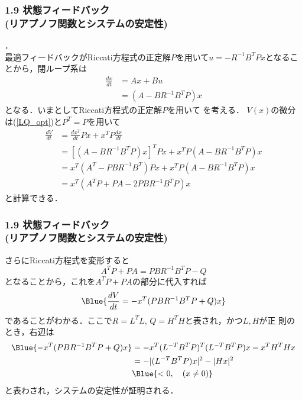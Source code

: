 \begin{frame}[t]
\frametitle{1.9 状態フィードバック \\ (リアプノフ関数とシステムの安定性)}
．\\
最適フィードバックがRiccati方程式の正定解$P$を用いて$u = -R^{-1} B^T P x$となることから，閉ループ系は
\begin{align}
 \frac{dx}{dt} &= Ax + B u \nonumber \\
               &= (A - B R^{-1} B^T P)x
 \label{LQ_opt}
\end{align}
となる．いまとしてRiccati方程式の正定解$P$を用いて
を考える．
$V(x)$の微分は(\ref{LQ_opt})と$P^T = P$を用いて
\begin{align}
 \frac{d V}{dt}
  &= \frac{d x^T}{dt} P x + x^T P \frac{dx}{dt} \nonumber \\
 &= [(A - B R^{-1} B^T P)x]^T Px + x^T P (A - B R^{-1} B^T P)x \nonumber \\
 &= x^T (A^T - P B R^{-1} B^T ) P x + x^T P (A - B R^{-1} B^T P)x \nonumber \\
 &= x^T (A^T P + P A - 2P B R^{-1} B^T P) x
\end{align}
と計算できる．
\end{frame}


\begin{frame}[t]
\frametitle{1.9 状態フィードバック \\ (リアプノフ関数とシステムの安定性)}
さらにRiccati方程式を変形すると
\begin{equation}
 A^T P + P A = P B R^{-1} B^T P - Q
\end{equation}
となることから，これを$A^T P + P A$の部分に代入すれば
\begin{equation}
 \Blue{\frac{dV}{dt} = - x^T (P B R^{-1} B^T P + Q) x}
\end{equation}
であることがわかる．ここで$R = L^T L$, $Q = H^T H$と表され，かつ$L, H$が正
則のとき，右辺は
\begin{align}
 \Blue{- x^T (P B R^{-1} B^T P + Q) x }
  &= - x^T (L^{-T} B^T P)^T (L^{-T} B^T P) x -   x^T H^T H x \nonumber \\
  &= - |(L^{-T} B^T P) x|^2 -  |H x|^2 \nonumber \\
 &\Blue{< 0, \quad (x \neq 0)}
\end{align}
と表わされ，システムの安定性が証明される．

\end{frame}


